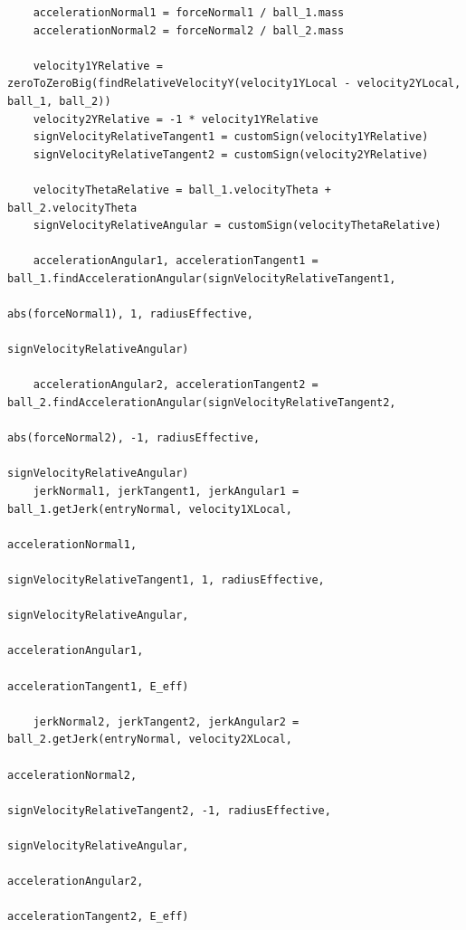 \documentclass[utf8x, 14pt, oneside, a4paper]{article}
\begin{document}
\begin{lstlisting}
    accelerationNormal1 = forceNormal1 / ball_1.mass
    accelerationNormal2 = forceNormal2 / ball_2.mass

    velocity1YRelative = zeroToZeroBig(findRelativeVelocityY(velocity1YLocal - velocity2YLocal, ball_1, ball_2))
    velocity2YRelative = -1 * velocity1YRelative
    signVelocityRelativeTangent1 = customSign(velocity1YRelative)
    signVelocityRelativeTangent2 = customSign(velocity2YRelative)

    velocityThetaRelative = ball_1.velocityTheta + ball_2.velocityTheta
    signVelocityRelativeAngular = customSign(velocityThetaRelative)

    accelerationAngular1, accelerationTangent1 = ball_1.findAccelerationAngular(signVelocityRelativeTangent1,
                                                                                abs(forceNormal1), 1, radiusEffective,
                                                                                signVelocityRelativeAngular)

    accelerationAngular2, accelerationTangent2 = ball_2.findAccelerationAngular(signVelocityRelativeTangent2,
                                                                                abs(forceNormal2), -1, radiusEffective,
                                                                                signVelocityRelativeAngular)
    jerkNormal1, jerkTangent1, jerkAngular1 = ball_1.getJerk(entryNormal, velocity1XLocal,
                                                             accelerationNormal1,
                                                             signVelocityRelativeTangent1, 1, radiusEffective,
                                                             signVelocityRelativeAngular,
                                                             accelerationAngular1,
                                                             accelerationTangent1, E_eff)
                                                             
    jerkNormal2, jerkTangent2, jerkAngular2 = ball_2.getJerk(entryNormal, velocity2XLocal,
                                                             accelerationNormal2,
                                                             signVelocityRelativeTangent2, -1, radiusEffective,
                                                             signVelocityRelativeAngular,
                                                             accelerationAngular2,
                                                             accelerationTangent2, E_eff)


\end{lstlisting}
\end{document}
